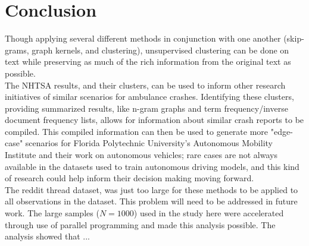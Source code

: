 %
%
%

\chapter{Conclusion}

Though applying several different methods in conjunction with one another (skip-grams, graph kernels, and clustering), unsupervised clustering can be done on text while preserving as much of the rich information from the original text as possible. \\
The NHTSA results, and their clusters, can be used to inform other research initiatives of similar scenarios for ambulance crashes. Identifying these clusters, providing summarized results, like n-gram graphs and term frequency/inverse document frequency lists, allows for information about similar crash reports to be compiled. This compiled information can then be used to generate more "edge-case" scenarios for Florida Polytechnic University's Autonomous Mobility Institute and their work on autonomous vehicles; rare cases are not always available in the datasets used to train autonomous driving models, and this kind of research could help inform their decision making moving forward.\\
The reddit thread dataset, was just too large for these methods to be applied to all observations in the dataset. This problem will need to be addressed in future work. The large samples ($N=1000$) used in the study here were accelerated through use of parallel programming and made this analysis possible. The analysis showed that ... 